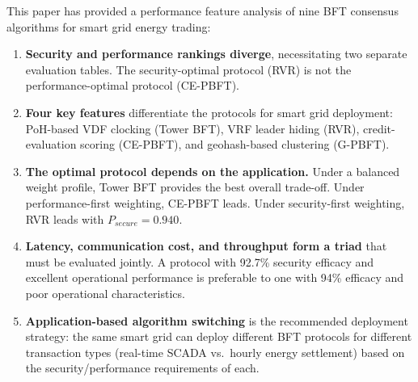 \documentclass[10pt,twocolumn,letterpaper]{article}
\begin{document}
This paper has provided a performance feature analysis of nine BFT consensus algorithms for smart grid energy trading:

\begin{enumerate}[leftmargin=*]
    \item \textbf{Security and performance rankings diverge}, necessitating two separate evaluation tables. The security-optimal protocol (RVR) is not the performance-optimal protocol (CE-PBFT).

    \item \textbf{Four key features} differentiate the protocols for smart grid deployment: PoH-based VDF clocking (Tower BFT), VRF leader hiding (RVR), credit-evaluation scoring (CE-PBFT), and geohash-based clustering (G-PBFT).

    \item \textbf{The optimal protocol depends on the application.} Under a balanced weight profile, Tower BFT provides the best overall trade-off. Under performance-first weighting, CE-PBFT leads. Under security-first weighting, RVR leads with $P_{secure} = 0.940$.

    \item \textbf{Latency, communication cost, and throughput form a triad} that must be evaluated jointly. A protocol with 92.7\% security efficacy and excellent operational performance is preferable to one with 94\% efficacy and poor operational characteristics.

    \item \textbf{Application-based algorithm switching} is the recommended deployment strategy: the same smart grid can deploy different BFT protocols for different transaction types (real-time SCADA vs.\ hourly energy settlement) based on the security/performance requirements of each.
\end{enumerate}

\end{document}
